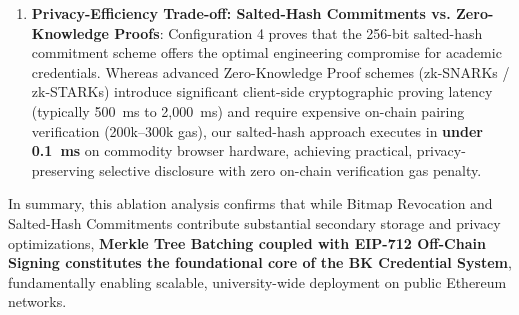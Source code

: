 \begin{enumerate}
    \item \textbf{Privacy-Efficiency Trade-off: Salted-Hash Commitments vs. Zero-Knowledge Proofs}:
    Configuration 4 proves that the 256-bit salted-hash commitment scheme offers the optimal engineering compromise for academic credentials. Whereas advanced Zero-Knowledge Proof schemes (zk-SNARKs / zk-STARKs) introduce significant client-side cryptographic proving latency (typically 500~ms to 2,000~ms) and require expensive on-chain pairing verification (200k--300k gas), our salted-hash approach executes in \textbf{under 0.1~ms} on commodity browser hardware, achieving practical, privacy-preserving selective disclosure with zero on-chain verification gas penalty.
\end{enumerate}

In summary, this ablation analysis confirms that while Bitmap Revocation and Salted-Hash Commitments contribute substantial secondary storage and privacy optimizations, \textbf{Merkle Tree Batching coupled with EIP-712 Off-Chain Signing constitutes the foundational core of the BK Credential System}, fundamentally enabling scalable, university-wide deployment on public Ethereum networks.
